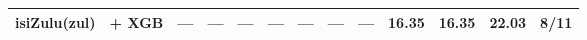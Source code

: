 \begin{table*}[h]
{\begin{tabular}{l|c|ccc|cccc|cccc}
            isiZulu(zul)                            & \citep{wang2024multilingual}     + XGB                                                       & —                            & —                            & —                           & —             & —             & —                 & —             & 16.35         & 16.35         & 22.03             & 8/11          \\
            \hline
        \end{tabular}
    }
\end{table*}
